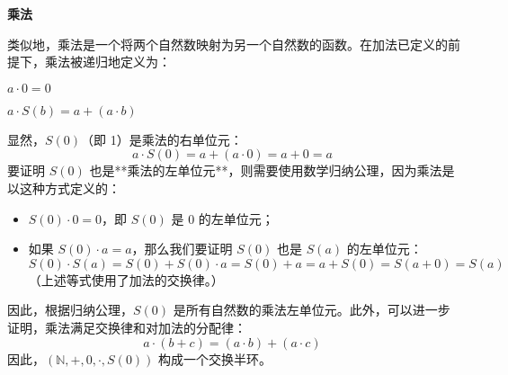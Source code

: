 \textbf{乘法}

类似地，乘法是一个将两个自然数映射为另一个自然数的函数。在加法已定义的前提下，乘法被递归地定义为：

$a \cdot 0 = 0$

$a \cdot S(b) = a + (a \cdot b)$

显然，$S(0)$（即 1）是乘法的右单位元：
$$
a \cdot S(0) = a + (a \cdot 0) = a + 0 = a~
$$
要证明 $S(0)$ 也是**乘法的左单位元**，则需要使用数学归纳公理，因为乘法是以这种方式定义的：
\begin{itemize}
\item $S(0) \cdot 0 = 0$，即 $S(0)$ 是 0 的左单位元；
\item 如果 $S(0) \cdot a = a$，那么我们要证明 $S(0)$ 也是 $S(a)$ 的左单位元：
$$
S(0) \cdot S(a) = S(0) + S(0) \cdot a = S(0) + a = a + S(0) = S(a + 0) = S(a)~
$$
（上述等式使用了加法的交换律。）
\end{itemize}
因此，根据归纳公理，$S(0)$ 是所有自然数的乘法左单位元。此外，可以进一步证明，乘法满足交换律和对加法的分配律：
$$
a \cdot (b + c) = (a \cdot b) + (a \cdot c)~
$$
因此，$(\mathbb{N}, +, 0, \cdot, S(0))$ 构成一个交换半环。
